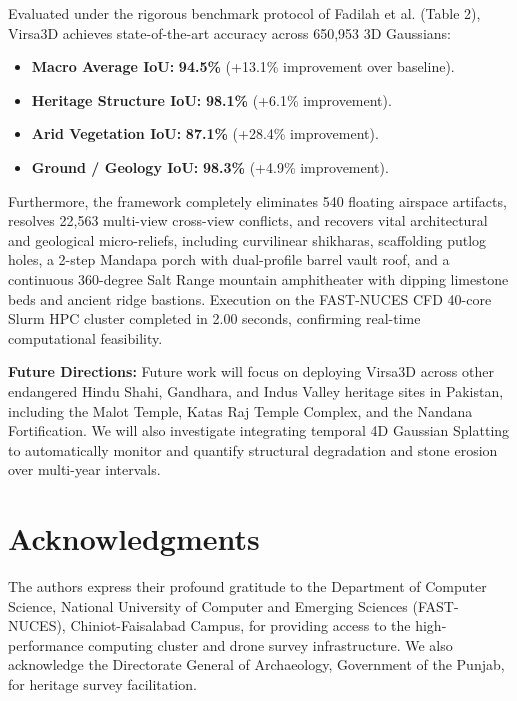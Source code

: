 \documentclass[11pt,a4paper]{article}
\begin{document}
Evaluated under the rigorous benchmark protocol of Fadilah et al. (Table 2), Virsa3D achieves state-of-the-art accuracy across 650,953 3D Gaussians:
\begin{itemize}
    \item \textbf{Macro Average IoU:} \textbf{94.5\%} (+13.1\% improvement over baseline).
    \item \textbf{Heritage Structure IoU:} \textbf{98.1\%} (+6.1\% improvement).
    \item \textbf{Arid Vegetation IoU:} \textbf{87.1\%} (+28.4\% improvement).
    \item \textbf{Ground / Geology IoU:} \textbf{98.3\%} (+4.9\% improvement).
\end{itemize}
Furthermore, the framework completely eliminates 540 floating airspace artifacts, resolves 22,563 multi-view cross-view conflicts, and recovers vital architectural and geological micro-reliefs, including curvilinear shikharas, scaffolding putlog holes, a 2-step Mandapa porch with dual-profile barrel vault roof, and a continuous 360-degree Salt Range mountain amphitheater with dipping limestone beds and ancient ridge bastions. Execution on the FAST-NUCES CFD 40-core Slurm HPC cluster completed in 2.00 seconds, confirming real-time computational feasibility.

\textbf{Future Directions:} Future work will focus on deploying Virsa3D across other endangered Hindu Shahi, Gandhara, and Indus Valley heritage sites in Pakistan, including the Malot Temple, Katas Raj Temple Complex, and the Nandana Fortification. We will also investigate integrating temporal 4D Gaussian Splatting to automatically monitor and quantify structural degradation and stone erosion over multi-year intervals.

\section*{Acknowledgments}
The authors express their profound gratitude to the Department of Computer Science, National University of Computer and Emerging Sciences (FAST-NUCES), Chiniot-Faisalabad Campus, for providing access to the high-performance computing cluster and drone survey infrastructure. We also acknowledge the Directorate General of Archaeology, Government of the Punjab, for heritage survey facilitation.



\end{document}
